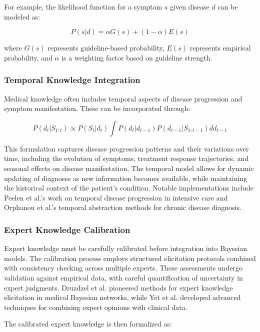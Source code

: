 \documentclass[3p,times,procedia]{elsarticle}
\begin{document}
For example, the likelihood function for a symptom $s$ given disease $d$ can be
modeled as:

\begin{equation}
P(s|d) = \alpha G(s) + (1-\alpha)E(s)
\end{equation}

where $G(s)$ represents guideline-based probability, $E(s)$ represents empirical
probability, and $\alpha$ is a weighting factor based on guideline strength.

\subsubsection{Temporal Knowledge Integration}
Medical knowledge often includes temporal aspects of disease progression and
symptom manifestation. These can be incorporated through:

\begin{equation}
P(d_t|S_{1:t}) \propto P(S_t|d_t)\int P(d_t|d_{t-1})P(d_{t-1}|S_{1:t-1})dd_{t-1}
\end{equation}

This formulation captures disease progression patterns and their variations over time,
including the evolution of symptoms, treatment response trajectories, and seasonal
effects on disease manifestation. The temporal model allows for dynamic updating
of diagnoses as new information becomes available, while maintaining the historical
context of the patient's condition. Notable implementations include Peelen et al.'s \cite{Peelen2010}
work on temporal disease progression in intensive care and Orphanou et al.'s \cite{Orphanou2016}
temporal abstraction methods for chronic disease diagnosis.

\subsubsection{Expert Knowledge Calibration}
Expert knowledge must be carefully calibrated before integration into Bayesian
models. The calibration process employs structured elicitation protocols combined
with consistency checking across multiple experts. These assessments undergo
validation against empirical data, with careful quantification of uncertainty
in expert judgments. Druzdzel et al. \cite{Druzdzel1999} pioneered methods for expert knowledge
elicitation in medical Bayesian networks, while Yet et al. \cite{Yet2014} developed advanced
techniques for combining expert opinions with clinical data.

The calibrated expert knowledge is then formalized as:
\end{document}
